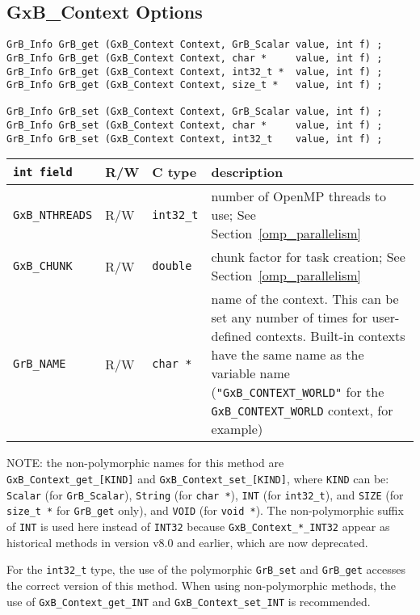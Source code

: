 
\newpage
\subsection{{\sf GxB\_Context} Options}
\label{get_set_context}

\begin{mdframed}[userdefinedwidth=6in]
{\footnotesize
\begin{verbatim}
GrB_Info GrB_get (GxB_Context Context, GrB_Scalar value, int f) ;
GrB_Info GrB_get (GxB_Context Context, char *     value, int f) ;
GrB_Info GrB_get (GxB_Context Context, int32_t *  value, int f) ;
GrB_Info GrB_get (GxB_Context Context, size_t *   value, int f) ;

GrB_Info GrB_set (GxB_Context Context, GrB_Scalar value, int f) ;
GrB_Info GrB_set (GxB_Context Context, char *     value, int f) ;
GrB_Info GrB_set (GxB_Context Context, int32_t    value, int f) ;
\end{verbatim}
}\end{mdframed}

\noindent
{\small
\begin{tabular}{|l|l|l|p{3.5in}|}
\hline
\verb'int field'                    & R/W  & C type        & description \\
\hline
\verb'GxB_NTHREADS' & R/W & \verb'int32_t' & number of OpenMP threads to use;
    See Section~\ref{omp_parallelism} \\
\verb'GxB_CHUNK'    & R/W & \verb'double' & chunk factor for task creation;
    See Section~\ref{omp_parallelism} \\
\hline
\verb'GrB_NAME'         & R/W  & \verb'char *' & name of the context.
    This can be set any number of times for user-defined contexts.  Built-in
    contexts have the same name as the variable name (\verb'"GxB_CONTEXT_WORLD"'
    for the \verb'GxB_CONTEXT_WORLD' context, for example) \\
\hline
\end{tabular}
}

NOTE: the non-polymorphic names for this method are
\verb'GxB_Context_get_[KIND]' and \verb'GxB_Context_set_[KIND]', where
\verb'KIND' can be:
    \verb'Scalar' (for \verb'GrB_Scalar'),
    \verb'String' (for \verb'char *'),
    \verb'INT' (for \verb'int32_t'), and
    \verb'SIZE' (for \verb'size_t *' for \verb'GrB_get' only), and
    \verb'VOID' (for \verb'void *').
The non-polymorphic suffix of \verb'INT' is used here instead of
\verb'INT32' because \verb'GxB_Context_*_INT32' appear as historical methods
in version v8.0 and earlier, which are now deprecated.

For the \verb'int32_t' type, the use of the polymorphic \verb'GrB_set' and
\verb'GrB_get' accesses the correct version of this method.  When using
non-polymorphic methods, the use of \verb'GxB_Context_get_INT' and
\verb'GxB_Context_set_INT' is recommended.

